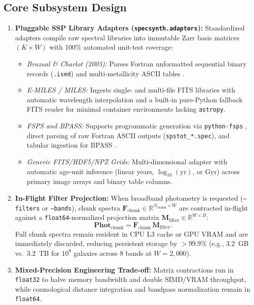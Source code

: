 \documentclass[preprint,12pt,authoryear]{elsarticle}
\begin{document}
\subsection{Core Subsystem Design}
\begin{enumerate}
\item \textbf{Pluggable SSP Library Adapters (\texttt{specsynth.adapters}):} Standardized adapters compile raw spectral libraries into immutable Zarr basis matrices $(K \times W)$ with 100\% automated unit-test coverage:
  \begin{itemize}
  \item \emph{Bruzual \& Charlot (2003):} Parses Fortran unformatted sequential binary records (\texttt{.ised}) and multi-metallicity ASCII tables \citep{bruzual2003stellar}.
  \item \emph{E-MILES / MILES:} Ingests single- and multi-file FITS libraries \citep{vazdekis2016uv} with automatic wavelength interpolation and a built-in pure-Python fallback FITS reader for minimal container environments lacking \texttt{astropy}.
  \item \emph{FSPS and BPASS:} Supports programmatic generation via \texttt{python-fsps} \citep{conroy2009propagation}, direct parsing of raw Fortran ASCII outputs (\texttt{spstot\_*.spec}), and tabular ingestion for BPASS \citep{eldridge2017binary}.
  \item \emph{Generic FITS/HDF5/NPZ Grids:} Multi-dimensional adapter with automatic age-unit inference (linear years, $\log_{10}(\mathrm{yr})$, or Gyr) across primary image arrays and binary table columns.
  \end{itemize}
\item \textbf{In-Flight Filter Projection:} When broadband photometry is requested (\texttt{--filters} or \texttt{--bands}), chunk spectra $\mathbf{F}_{\text{chunk}} \in \mathbb{R}^{N_{\text{chunk}} \times W}$ are contracted in-flight against a \texttt{float64}-normalized projection matrix $\mathbf{M}_{\text{filter}} \in \mathbb{R}^{W \times B}$:
  \begin{equation}
  \mathbf{Phot}_{\text{chunk}} = \mathbf{F}_{\text{chunk}}\,\mathbf{M}_{\text{filter}}.
  \end{equation}
  Full chunk spectra remain resident in CPU L3 cache or GPU VRAM and are immediately discarded, reducing persistent storage by $>99.9\%$ (e.g., $3.2$~GB vs.\ $3.2$~TB for $10^8$ galaxies across 8 bands at $W=2{,}000$).
\item \textbf{Mixed-Precision Engineering Trade-off:} Matrix contractions run in \texttt{float32} to halve memory bandwidth and double SIMD/VRAM throughput, while cosmological distance integration and bandpass normalization remain in \texttt{float64}.

\end{enumerate}
\end{document}
